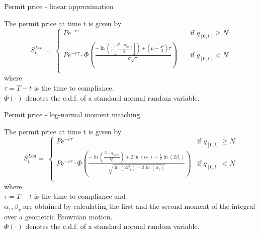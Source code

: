 
{Permit price - linear approximation}
    \begin{block}{}
    The permit price at time t is given by
  $$
  S_t^{Lin} = \ \left\{
         \begin{array}{ll}
            P e^{-r\tau}
            & \quad \mbox{if $q_{[0,t]} \ge N$} \\
            P e^{-r\tau} \cdot \Phi \left(\frac{-\ln\left( \frac{1}{\tau} \left[ \frac{N - q_{[0,t]}}{Q_t} \right] \right) + \left( \mu - \frac{\sigma^2}{2}\right)\tau}{\sigma \sqrt{\tau}} \right) & \quad \mbox{if $q_{[0,t]} < N$} \\
         \end{array} \right.
$$
where \\
$\tau = T - t$ is the time to compliance. \\
$\Phi(\cdot)$ denotes the c.d.f. of a standard normal random variable.
    \end{block}


{Permit price - log-normal moment matching}
    \begin{block}{}
    The permit price at time t is given by
$$
S_t^{Log} = \ \left\{
         \begin{array}{ll}
            P e^{-r\tau}
            &\mbox{if $q_{[0,t]} \ge N$} \\
            P e^{-r\tau} \cdot \Phi \left(\frac{-\ln\left( \frac{N - q_{[0,t]}}{Q_t} \right) + 2\ln(\alpha_{\tau}) - \frac{1}{2} \ln(2\beta_{\tau})}{\sqrt{\ln(2\beta_{\tau}) - 2\ln(\alpha_{\tau})}} \right) & \mbox{if $q_{[0,t]} < N$} \\
         \end{array} \right.
$$
where \\
$\tau = T - t$ is the time to compliance and \\
$\alpha_{\tau}, \beta_{\tau}$ are obtained by calculating the first and the second moment of the integral over a geometric Brownian motion. \\
$\Phi(\cdot)$ denotes the c.d.f. of a standard normal random variable.
    \end{block}

